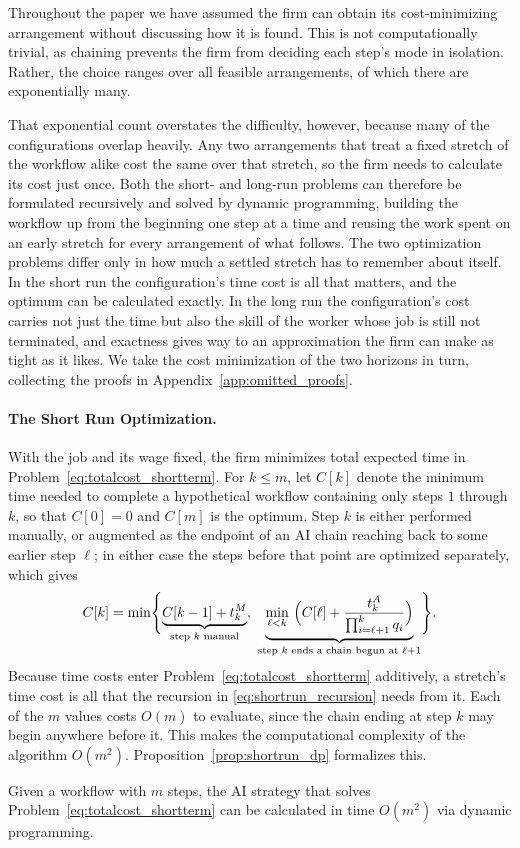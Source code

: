 Throughout the paper we have assumed the firm can obtain its cost-minimizing arrangement without discussing how it is found.
This is not computationally trivial, as chaining prevents the firm from deciding each step's mode in isolation. 
Rather, the choice ranges over all feasible arrangements, of which there are exponentially many.

That exponential count overstates the difficulty, however, because many of the configurations overlap heavily.
Any two arrangements that treat a fixed stretch of the workflow alike cost the same over that stretch, so the firm needs to calculate its cost just once.
Both the short- and long-run problems can therefore be formulated recursively and solved by dynamic programming, building the workflow up from the beginning one step at a time and reusing the work spent on an early stretch for every arrangement of what follows.
The two optimization problems differ only in how much a settled stretch has to remember about itself.
In the short run the configuration's time cost is all that matters, and the optimum can be calculated exactly.
In the long run the configuration's cost carries not just the time but also the skill of the worker whose job is still not terminated, and exactness gives way to an approximation the firm can make as tight as it likes.
We take the cost minimization of the two horizons in turn, collecting the proofs in Appendix~\ref{app:omitted_proofs}.

\paragraph{The Short Run Optimization.}
With the job and its wage fixed, the firm minimizes total expected time in Problem~\eqref{eq:totalcost_shortterm}.
For $k \leq m$, let $C[k]$ denote the minimum time needed to complete a hypothetical workflow containing only steps $1$ through $k$, so that $C[0] = 0$ and $C[m]$ is the optimum.
Step $k$ is either performed manually, or augmented as the endpoint of an AI chain reaching back to some earlier step $\ell$; in either case the steps before that point are optimized separately, which gives
\begin{align}
\label{eq:shortrun_recursion}
C[k] = \min\Biggl\{ \underbrace{C[k-1] + t^{M}_{k}}_{\text{step $k$ manual}}, \ \underbrace{\min_{\ell < k}\ \Bigl( C[\ell] + \frac{t^{A}_{k}}{\prod_{i=\ell+1}^{k} q_i} \Bigr)}_{\text{step $k$ ends a chain begun at } \ell+1} \Biggr\}.
\end{align}
Because time costs enter Problem~\eqref{eq:totalcost_shortterm} additively, a stretch's time cost is all that the recursion in \eqref{eq:shortrun_recursion} needs from it.
Each of the $m$ values costs $O(m)$ to evaluate, since the chain ending at step $k$ may begin anywhere before it.
This makes the computational complexity of the algorithm $O(m^2)$.
Proposition~\ref{prop:shortrun_dp} formalizes this.
\begin{proposition}
\label{prop:shortrun_dp}
Given a workflow with $m$ steps, the AI strategy that solves Problem~\eqref{eq:totalcost_shortterm} can be calculated in time $O(m^2)$ via dynamic programming.
\end{proposition}

